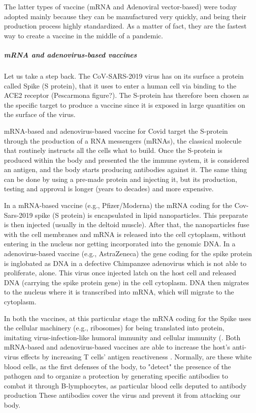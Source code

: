 \documentclass[graybox]{svmult}
\begin{document}
The latter types of vaccine (mRNA and Adenoviral vector-based) were today adopted mainly because they can be manufactured very quickly, and being their production process highly standardized. As a matter of fact, they are the fastest way to create a vaccine in the middle of a pandemic.

\subparagraph{mRNA and adenovirus-based vaccines}
\label{based} 

Let us take a step back. The CoV-SARS-2019 virus has on its surface a protein called Spike (S protein), that it uses to enter a human cell via binding to the ACE2 receptor (Pescarmona figure?). The S-protein has therefore been chosen as the specific target to produce a vaccine since it is exposed in large quantities on the surface of the virus.

mRNA-based and adenovirus-based vaccine for Covid target the S-protein through the production of a RNA messengers (mRNAs), the classical molecule that routinely instructs all the cells what to build. Once the S-protein is produced within the body and presented the the immune system, it is considered an antigen, and the body starts producing antibodies against it. The same thing can be done by using a pre-made protein and injecting it, but its production, testing and approval is longer (years to decades) and more expensive.

In a mRNA-based vaccine (e.g., Pfizer/Moderna) the mRNA coding for the Cov-Sars-2019 spike (S protein)  is encapsulated in lipid nanoparticles. This preparate is then injected (usually in the deltoid muscle). After that, the nanoparticles fuse with the cell membranes and mRNA is  released into the cell cytoplasm, without entering in the nucleus nor getting incorporated into the genomic DNA. In a adenovirus-based vaccine (e.g., AstraZeneca) the gene coding for the spike protein is inglobated as DNA in a defective Chimpanzee adenovirus which is not able to proliferate, alone.  This virus once injected latch on the host cell and released DNA (carrying the spike protein gene) in the cell cytoplasm. DNA then migrates to the nucleus where it is transcribed into mRNA, which will migrate to the cytoplasm.

In both the vaccines, at this particular stage the mRNA coding for the Spike uses the cellular machinery (e.g., ribosomes) for being translated into protein, imitating virus-infection-like humoral immunity and cellular immunity (\cite{monslow2020}. Both mRNA-based and adenovirus-based vaccines are able to increase the host’s anti-virus effects by increasing T cells’ antigen reactiveness \cite{wang2021}. Normally, are these white blood cells, as the first defenses of the body, to "detect" the presence of the pathogen and to organize a protection by generating specific antibodies to combat it through B-lymphocytes, as particular blood cells deputed to antibody production \cite{ratajczak2018} These antibodies cover the virus and prevent it from attacking our body. 
\end{document}
